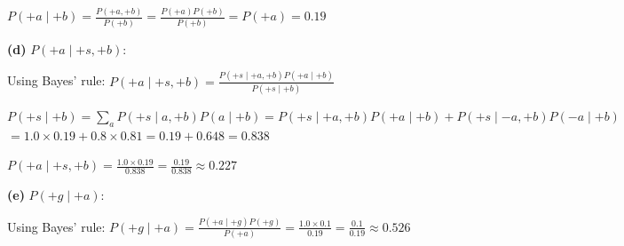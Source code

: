 \documentclass[11pt]{article}
\begin{document}
$P(+a \mid +b) = \frac{P(+a, +b)}{P(+b)} = \frac{P(+a) P(+b)}{P(+b)} = P(+a) = \boxed{0.19}$

\textbf{(d)} $P(+a \mid +s, +b)$:

Using Bayes' rule:
$P(+a \mid +s, +b) = \frac{P(+s \mid +a, +b) P(+a \mid +b)}{P(+s \mid +b)}$

$P(+s \mid +b) = \sum_{a} P(+s \mid a, +b) P(a \mid +b) = P(+s \mid +a, +b) P(+a \mid +b) + P(+s \mid -a, +b) P(-a \mid +b)$
$= 1.0 \times 0.19 + 0.8 \times 0.81 = 0.19 + 0.648 = 0.838$

$P(+a \mid +s, +b) = \frac{1.0 \times 0.19}{0.838} = \frac{0.19}{0.838} \approx \boxed{0.227}$

\textbf{(e)} $P(+g \mid +a)$:

Using Bayes' rule:
$P(+g \mid +a) = \frac{P(+a \mid +g) P(+g)}{P(+a)} = \frac{1.0 \times 0.1}{0.19} = \frac{0.1}{0.19} \approx \boxed{0.526}$
\end{document}
